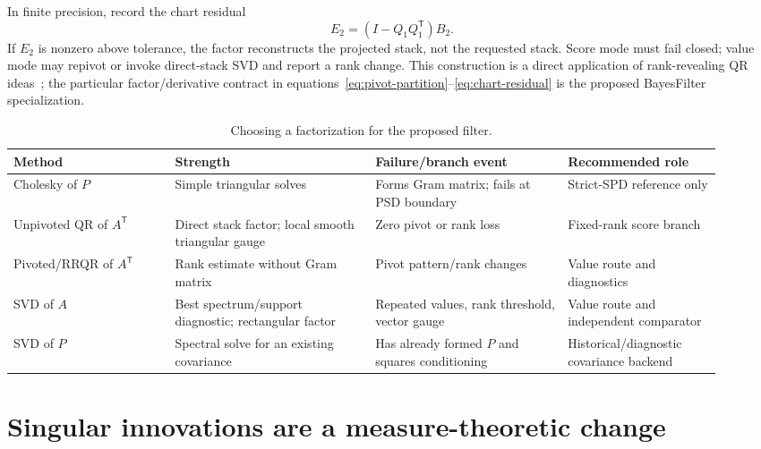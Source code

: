 \documentclass[11pt]{article}
\newcommand{\transpose}{^{\mathsf T}}
\begin{document}
In finite precision, record the chart residual
\begin{equation}
 E_2=(I-Q_1Q_1\transpose)B_2.
 \label{eq:chart-residual}
\end{equation}
If $E_2$ is nonzero above tolerance, the factor reconstructs the projected
stack, not the requested stack.  Score mode must fail closed; value mode may
repivot or invoke direct-stack SVD and report a rank change.  This construction
is a direct application of rank-revealing QR ideas~\cite{chan1987,gu1996}; the
particular factor/derivative contract in
equations~\eqref{eq:pivot-partition}--\eqref{eq:chart-residual} is the proposed
BayesFilter specialization.

\begin{table}[ht]
\centering
\caption{Choosing a factorization for the proposed filter.}
\begin{tabular}{p{0.21\linewidth}p{0.26\linewidth}p{0.25\linewidth}p{0.20\linewidth}}
\toprule
Method & Strength & Failure/branch event & Recommended role \\
\midrule
Cholesky of $P$ & Simple triangular solves & Forms Gram matrix; fails at PSD boundary &
  Strict-SPD reference only \\
Unpivoted QR of $A\transpose$ & Direct stack factor; local smooth triangular gauge &
  Zero pivot or rank loss & Fixed-rank score branch \\
Pivoted/RRQR of $A\transpose$ & Rank estimate without Gram matrix & Pivot pattern/rank changes &
  Value route and diagnostics \\
SVD of $A$ & Best spectrum/support diagnostic; rectangular factor & Repeated values,
  rank threshold, vector gauge & Value route and independent comparator \\
SVD of $P$ & Spectral solve for an existing covariance & Has already formed $P$ and
  squares conditioning & Historical/diagnostic covariance backend \\
\bottomrule
\end{tabular}
\end{table}

\section{Singular innovations are a measure-theoretic change}
\end{document}
